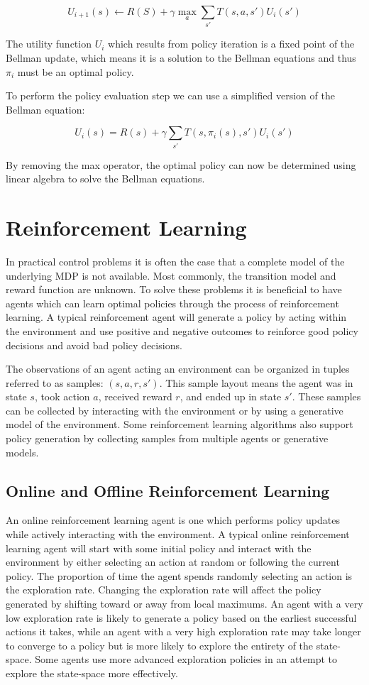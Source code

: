 \[
    U_{i+1}(s) \gets R(S) + \gamma \max_a \sum_{s'}T(s,a,s')U_i(s')
\]

The utility function $U_i$ which results from policy iteration is a fixed point of the Bellman update, which means it is a solution to the Bellman equations and thus $\pi_i$ must be an optimal policy.

To perform the policy evaluation step we can use a simplified version of the Bellman equation:

\[
    U_i(s) = R(s) + \gamma \sum_{s'} T(s, \pi_i(s), s')U_i(s')
\]

By removing the max operator, the optimal policy can now be determined using linear algebra to solve the Bellman equations.

\section{Reinforcement Learning}

In practical control problems it is often the case that a complete model of the underlying MDP is not available. Most commonly, the transition model and reward function are unknown. To solve these problems it is beneficial to have agents which can learn optimal policies through the process of reinforcement learning. A typical reinforcement agent will generate a policy by acting within the environment and use positive and negative outcomes to reinforce good policy decisions and avoid bad policy decisions.

The observations of an agent acting an environment can be organized in tuples referred to as samples: $(s, a, r, s')$. This sample layout means the agent was in state $s$, took action $a$, received reward $r$, and ended up in state $s'$. These samples can be collected by interacting with the environment or by using a generative model of the environment. Some reinforcement learning algorithms also support policy generation by collecting samples from multiple agents or generative models.

\subsection{Online and Offline Reinforcement Learning}

An online reinforcement learning agent is one which performs policy updates while actively interacting with the environment. A typical online reinforcement learning agent will start with some initial policy and interact with the environment by either selecting an action at random or following the current policy. The proportion of time the agent spends randomly selecting an action is the exploration rate. Changing the exploration rate will affect the policy generated by shifting toward or away from local maximums. An agent with a very low exploration rate is likely to generate a policy based on the earliest successful actions it takes, while an agent with a very high exploration rate may take longer to converge to a policy but is more likely to explore the entirety of the state-space. Some agents use more advanced exploration policies in an attempt to explore the state-space more effectively.

